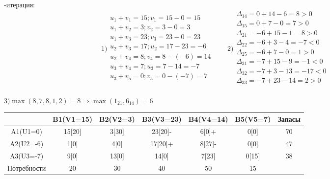 \documentclass[a4paper, 12pt]{article}
\begin{document}
-итерация:\\
\begin{equation*}
  1)\begin{split}
    u_1 + v_1 = 15; v_1 = 15-0 = 15\\
    u_1 + v_2 = 3; v_2 = 3-0 = 3\\
    u_1 + v_3 = 23; v_3 = 23-0 = 23\\
    u_2 + v_3 = 17; u_2 = 17-23 = -6\\
    u_2 + v_4 = 8; v_4 = 8-(-6) = 14\\
    u_3 + v_4 = 7; u_3 = 7-14 = -7\\
    u_3 + v_5 = 0; v_5 = 0-(-7) = 7\\
  \end{split}
  \qquad  
  2)\begin{split}
    \Delta_{14} = 0 + 14 - 6 = 8 > 0 \\
    \Delta_{15} = 0 + 7 - 0 = 7 > 0 \\
    \Delta_{21} = -6 + 15 - 1 = 8 > 0 \\
    \Delta_{22} = -6 + 3 - 4 = -7 < 0 \\
    \Delta_{25} = -6 + 7 - 0 = 1 > 0 \\
    \Delta_{31} = -7 + 15 - 9 = -1 < 0 \\
    \Delta_{32} = -7 + 3 - 13 = -17 < 0 \\
    \Delta_{33} = -7 + 23 - 14 = 2 > 0 \\
  \end{split}
\end{equation*}

\begin{math}
  3) \max(8,7,8,1,2)= 8 \Rightarrow \max(1_{21},6_{14}) = 6
\end{math}
\begin{table}[H]
\centering
\begin{tabular}{|c|c|c|c|c|c|c|}
\hline
            & B1(V1=15)& B2(V2=3) & B3(V3=23) & B4(V4=14) & B5(V5=7)  & Запасы \\ \hline
A1(U1=0)    & 15[20]   & 3[30]    & 23[20]-   & 6[0]+     & 0[0]      & 70     \\ \hline
A2(U2=-6)   & 1[0]     & 4[0]     & 17[20]+   & 8[27]-    & 0[0]      & 47     \\ \hline
A3(U3=-7)   & 9[0]     & 13[0]    & 14[0]     & 7[23]     & 0[15]     & 38     \\ \hline
Потребности & 20       & 30       & 40        & 50        & 15        &        \\ \hline
\end{tabular}
\end{table}
\end{document}
